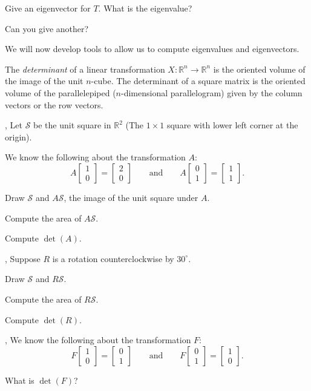 \documentclass{article}
\newcommand{\R}{\mathbb{R}}
\newcommand{\mat}[1]{\begin{bmatrix}#1\end{bmatrix}}
\begin{document}
	\begin{Enum}[resume]
		\item Give an eigenvector for $T$.  What is the eigenvalue?
		\item Can you give another?
	\end{Enum}

	We will now develop tools to allow us to compute eigenvalues and eigenvectors.

	\begin{Def}
	The \emph{determinant} of a linear transformation $X:\R^n\to \R^n$ is the 
	oriented volume of the image of the unit $n$-cube.  The determinant
	of a square matrix is the oriented volume of the parallelepiped 
	($n$-dimensional parallelogram) given by the column vectors or the row
	vectors.
	\end{Def}

	\sep
	Let $\mathcal S$ be the unit square in $\R^2$ (The $1\times 1$ square with lower
	left corner at the origin).

	We know the following about the transformation $A$:
	\[
		A\mat{1\\0}=\mat{2\\0}\qquad\text{and}\qquad A\mat{0\\1}=\mat{1\\1}.
	\]
	\begin{Enum}
		\item Draw $\mathcal S$ and $A\mathcal S$, the image of the unit square
			under $A$.
		\item Compute the area of $A\mathcal S$.
		\item Compute $\det(A)$.
	\end{Enum}

	\sep
	Suppose $R$ is a rotation counterclockwise by $30^\circ$.
	\begin{Enum}
		\item Draw $\mathcal S$ and $R\mathcal S$.
		\item Compute the area of $R\mathcal S$.
		\item Compute $\det(R)$.
	\end{Enum}
	
	\sep
	We know the following about the transformation $F$:
	\[
		F\mat{1\\0}=\mat{0\\1}\qquad\text{and}\qquad F\mat{0\\1}=\mat{1\\0}.
	\]
	\begin{Enum}
		\item What is $\det(F)$?
	\end{Enum}
\end{document}
